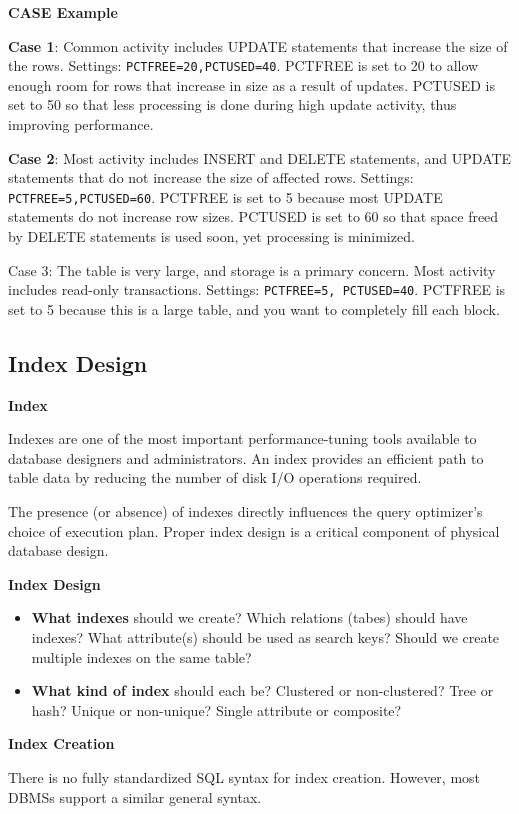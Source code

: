 \documentclass[11pt]{article}
\newcommand{\vs}[]{
    \vspace{11pt}
}
\newcommand{\subsec}[1]{
    \vspace{11pt}
    \subsection{#1}
    \vspace{11pt}
}
\newcommand{\boldsec}[1]{
    \vspace{11pt}
    \textbf{#1}
    \vspace{11pt}
}
\newcommand{\boldsecbottom}[1]{
    \textbf{#1}
    \vspace{11pt}
}
\begin{document}
\newpage
\boldsecbottom{CASE Example}

\textbf{Case 1}: Common activity includes UPDATE statements that increase the size of the rows. Settings: \texttt{PCTFREE=20,PCTUSED=40}. PCTFREE is set to 20 to allow enough room for rows that increase in size as a result of updates. PCTUSED is set to 50 so that less processing is done during high update activity, thus improving performance.

\textbf{Case 2}: Most activity includes INSERT and DELETE statements, and UPDATE statements that do not increase the size of affected rows. Settings: \texttt{PCTFREE=5,PCTUSED=60}. PCTFREE is set to 5 because most UPDATE statements do not increase row sizes. PCTUSED is set to 60 so that space freed by DELETE statements is used soon, yet processing is minimized.

Case 3: The table is very large, and storage is a primary concern. Most activity includes read-only transactions. Settings: \texttt{PCTFREE=5, PCTUSED=40}. PCTFREE is set to 5 because this is a large table, and you want to completely fill each block.

\subsec{Index Design}

\boldsecbottom{Index}

Indexes are one of the most important performance-tuning tools available to database designers and administrators. An index provides an efficient path to table data by reducing the number of disk I/O operations required. 

The presence (or absence) of indexes directly influences the query optimizer's choice of execution plan. Proper index design is a critical component of physical database design.

\boldsec{Index Design}

\begin{itemize}
    \item \textbf{What indexes} should we create? Which relations (tabes) should have indexes? What attribute(s) should be used as search keys? Should we create multiple indexes on the same table?
    \item \textbf{What kind of index} should each be? Clustered or non-clustered? Tree or hash? Unique or non-unique? Single attribute or composite?
\end{itemize}
\vs

\boldsecbottom{Index Creation}

There is no fully standardized SQL syntax for index creation. However, most DBMSs support a similar general syntax.
\end{document}
